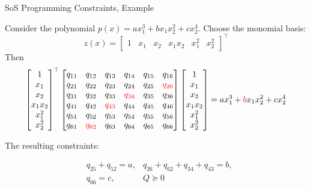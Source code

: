 \documentclass{beamer}
\begin{document}
\begin{frame}{SoS Programming Constraints, Example}
	\begin{flushleft}
		
		Consider the polynomial $p(x)=a x_1^3+b x_1x_2^2+c x_2^4$. Choose the monomial basis:		
		\[
		z(x)=
		\begin{bmatrix}
			1 &
			x_1 &
			x_2 &
			x_1x_2 &
			x_1^2 &
			x_2^2
		\end{bmatrix}^\top
		\]
		Then
		\[
		\begin{bmatrix}
			1\\
			x_1\\
			x_2\\
			x_1x_2\\
			x_1^2\\
			x_2^2
		\end{bmatrix}^\top
		\begin{bmatrix}
			q_{11}&q_{12}&q_{13}&q_{14}&q_{15}&q_{16}\\
			q_{21}&q_{22}&q_{23}&q_{24}&q_{25}&\color{red}{q_{26}}\\
			q_{31}&q_{32}&q_{33}&\color{red}{q_{34}}&q_{35}&q_{36}\\
			q_{41}&q_{42}&\color{red}{q_{43}}&q_{44}&q_{45}&q_{46}\\
			q_{51}&q_{52}&q_{53}&q_{54}&q_{55}&q_{56}\\
			q_{61}&\color{red}{q_{62}}&q_{63}&q_{64}&q_{65}&q_{66}
		\end{bmatrix}
		\begin{bmatrix}
			1\\
			x_1\\
			x_2\\
			x_1x_2\\
			x_1^2\\
			x_2^2
		\end{bmatrix}
		=
		a x_1^3+\textcolor{red}{b}x_1 x_2^2 + c x_2^4
		\]
		
		The resulting constraints:
		
		\begin{align*}
			& q_{25} + q_{52} = a, & q_{26} + q_{62} + q_{34} + q_{43} = b, \\
			& q_{66} = c, & Q \succeq 0
		\end{align*}
		
	\end{flushleft}
\end{frame}
\end{document}
